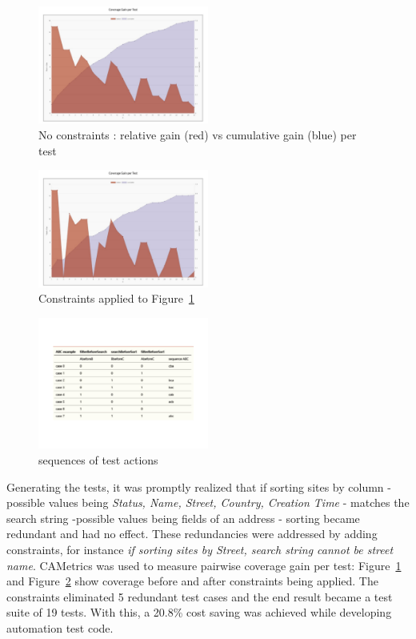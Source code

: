 \documentclass[conference]{IEEEtran}
\begin{document}
	\begin{figure}[!t]
		\includegraphics[width=0.50\textwidth,]{coverageGainPerTest.pdf}
		\caption{No constraints : relative gain (red) vs cumulative gain (blue) per test}
		\label{fig:coverageGainPerTest}
	\end{figure}

	\begin{figure}[!t]
		\includegraphics[width=0.50\textwidth,]{coverageGainPerTest_withConstraints.pdf}
		\caption{Constraints applied to Figure~\ref{fig:coverageGainPerTest}}
		\label{fig:coverageGainPerTest_withConstraints}
	\end{figure}

	\begin{figure}[!b]
		\includegraphics[width=0.50\textwidth,]{sorting.pdf}
		\caption{sequences of test actions}
		\label{fig:sorting}
	\end{figure}

	Generating the tests, it was promptly realized that if sorting sites by column - possible values being \textit{Status, Name, Street, Country, Creation Time} - matches the search string -possible values being fields of an address - sorting became redundant and had no effect.
	These redundancies were addressed by adding constraints, for instance \textit{if sorting sites by Street, search string cannot be street name}. 
	CAMetrics was used to measure pairwise coverage gain per test: Figure~\ref{fig:coverageGainPerTest} and Figure~\ref{fig:coverageGainPerTest_withConstraints} show coverage before and after constraints being applied.
	The constraints eliminated 5 redundant test cases and the end result became a test suite of 19 tests. With this, a 20.8\% cost saving was achieved while developing automation test code.
	
\end{document}
